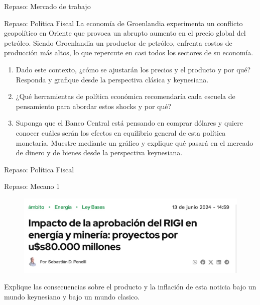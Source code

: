 \documentclass{beamer}
\begin{document}
\begin{frame}{Repaso: Mercado de trabajo}
    
\end{frame}

\begin{frame}{Repaso: Política Fiscal}
    La economía de Groenlandia experimenta un conflicto geopolítico en Oriente que provoca un abrupto aumento en el precio global del petróleo. Siendo Groenlandia un productor de petróleo, enfrenta costos de producción más altos, lo que repercute en casi todos los sectores de su economía.
    \begin{enumerate}
        \item Dado este contexto, ¿cómo se ajustarán los precios y el producto y por qué? Responda y grafique desde la perspectiva clásica y keynesiana.
        \item ¿Qué herramientas de política económica recomendaría cada escuela de pensamiento para abordar estos shocks y por qué?
        \item Suponga que el Banco Central está pensando en comprar dólares y quiere conocer cuáles serán los efectos en equilibrio general de esta política monetaria. Muestre mediante un gráfico y explique qué pasará en el mercado de dinero y de bienes desde la perspectiva keynesiana. 
    \end{enumerate}
\end{frame}

\begin{frame}{Repaso: Política Fiscal}
    
\end{frame}

\begin{frame}{Repaso: Mecano 1}

    \begin{figure}[h!]
        \centering
        \includegraphics[width=1\textwidth]{../Figures/ejercicio_noticia2.jpg}
    \end{figure}
    Explique las consecuencias sobre el producto y la inflación de esta noticia bajo un mundo keynesiano y bajo un mundo clasico.
\end{frame}
\end{document}
